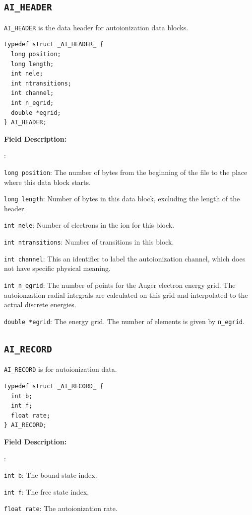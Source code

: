 \documentclass[twoside,letterpaper]{refrep}
\newenvironment{dbdesc}{\textbf{Field Description:} \begin{list}
	{:}{\setlength{\labelwidth}{2in}
	   \setlength{\leftmargin}{2in}
	   \setlength{\labelsep}{0.1in}
	   \setlength{\rightmargin}{0.2in}}}
	{\end{list}}
\begin{document}
\subsection{\texttt{AI\_HEADER}}
\texttt{AI\_HEADER} is the data header for autoionization data blocks.

\begin{verbatim}
typedef struct _AI_HEADER_ {
  long position;
  long length;
  int nele;
  int ntransitions;
  int channel;
  int n_egrid;
  double *egrid;
} AI_HEADER;
\end{verbatim}

\begin{dbdesc}
\item[\texttt{long position}:] The number of bytes from the beginning of the
file to the place where this data block starts.
\item[\texttt{long length}:] Number of bytes in this data block, excluding the
length of the header.
\item[\texttt{int nele}:] Number of electrons in the ion for this block.
\item[\texttt{int ntransitions}:] Number of transitions in this block.
\item[\texttt{int channel}:] This an identifier to label the autoionization
channel, which does not have specific physical meaning.
\item[\texttt{int n\_egrid}:] The number of points for the Auger electron
energy grid. The autoionzation radial integrals are calculated on this grid
and interpolated to the actual discrete energies.
\item[\texttt{double *egrid}:] The energy grid. The number of elements is
given by \texttt{n\_egrid}.
\end{dbdesc}

\subsection{\texttt{AI\_RECORD}}
\texttt{AI\_RECORD} is for autoionization data.

\begin{verbatim}
typedef struct _AI_RECORD_ {
  int b;
  int f;
  float rate;
} AI_RECORD;
\end{verbatim}

\begin{dbdesc}
\item[\texttt{int b}:] The bound state index.
\item[\texttt{int f}:] The free state index.
\item[\texttt{float rate}:] The autoionization rate.
\end{dbdesc}
\end{document}

